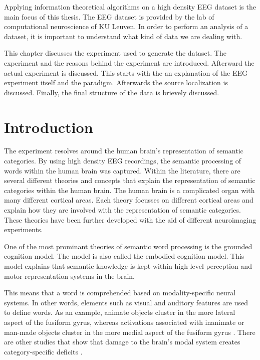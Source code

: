 Applying information theoretical algorithms on a high density EEG dataset is the main focus of this thesis. The EEG dataset is provided by the lab of computational neuroscience of KU Leuven. In order to perform an analysis of a dataset, it is important to understand what kind of data we are dealing with.

This chapter discusses the experiment used to generate the dataset. The experiment and the reasons behind the experiment are introduced. Afterward the actual experiment is discussed. This starts with the an explanation of the EEG experiment itself and the paradigm. Afterwards the source localization is discussed. Finally, the final structure of the data is brievely discussed.

\section{Introduction}

The experiment resolves around the human brain's representation of semantic categories. By using high density EEG recordings, the semantic processing of words within the human brain was captured. Within the literature, there are several different theories and concepts that explain the representation of semantic categories within the human brain. The human brain is a complicated organ with many different cortical areas. Each theory focusses on different cortical areas and explain how they are involved with the representation of semantic categories. These theories have been further developed with the aid of different neuroimaging experiments. 

One of the most prominant theories of semantic word processing is the grounded cognition model. The model is also called the embodied cognition model. This model explains that semantic knowledge is kept within high-level perception and motor representation systems in the brain. 

This means that a word is comprehended based on modality-specific neural systems. In other words, elements such as visual and auditory features are used to define words. As an example, animate objects cluster in the more lateral aspect of the fusiform gyrus, whereas activations associated with inanimate or man-made objects cluster in the more medial aspect of the fusiform gyrus \cite{landrum2015clinvar}. There are other studies that show that damage to the brain's modal system creates category-specific deficits \cite{barsalou2003grounding, caramazza2003organization}. 

